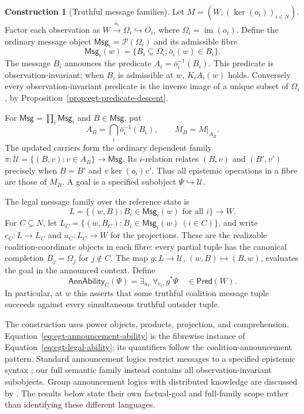 \documentclass[11pt,a4paper]{article}
\numberwithin{equation}{section}
\theoremstyle{definition}
\newtheorem{construction}[construction]{Construction}
\theoremstyle{remark}
\theoremstyle{plain}
\begin{document}
\begin{construction}[Truthful message families]
\label{con:egt-announcement-game}
Let $M=(W,(\ker(o_i))_{i\in N})$. Factor each observation as
$W\xrightarrow{\bar o_i}\Omega_i\hookrightarrow O_i$, where
$\Omega_i=\operatorname{im}(o_i)$. Define the ordinary message object
$\mathsf{Msg}_i=\mathcal P(\Omega_i)$ and its admissible fibre
\[
 \mathsf{Msg}_i(w)=\{B_i\subseteq\Omega_i:\bar o_i(w)\in B_i\}.
\]
The message $B_i$ announces the predicate
$A_i=\bar o_i^{-1}(B_i)$. This predicate is observation-invariant;
when $B_i$ is admissible at $w$, $K_iA_i(w)$ holds. Conversely every
observation-invariant predicate is the inverse image of a unique subset
of $\Omega_i$, by Proposition~\ref{prop:egt-predicate-descent}.

For $\mathsf{Msg}=\prod_i\mathsf{Msg}_i$ and $B\in\mathsf{Msg}$, put
\[
 A_B=\bigcap_i\bar o_i^{-1}(B_i),\qquad M_B=M|_{A_B}.
\]
The updated carriers form the ordinary dependent family
$\pi:\mathcal U=\{(B,v):v\in A_B\}\to\mathsf{Msg}$.
Its $i$-relation relates $(B,v)$ and $(B',v')$ precisely when
$B=B'$ and $v\ker(o_i)v'$. Thus all epistemic operations in a fibre
are those of $M_B$. A goal is a specified subobject
$\Psi\hookrightarrow\mathcal U$.

The legal message family over the reference state is
\[
 L=\{(w,B):B_i\in\mathsf{Msg}_i(w)\text{ for all }i\}
 \longrightarrow W.
\]
For $C\subseteq N$, let
$L_C=\{(w,B_C):B_i\in\mathsf{Msg}_i(w)\ (i\in C)\}$,
and write $e_C:L\to L_C$ and $u_C:L_C\to W$ for the projections.
These are the realizable coalition-coordinate objects in each fibre:
every partial tuple has the canonical completion $B_j=\Omega_j$ for
$j\notin C$. The map $g:L\to\mathcal U$, $(w,B)\mapsto(B,w)$,
evaluates the goal in the announced context. Define
\begin{equation}\label{eq:egt-announcement-ability}
 \mathsf{AnnAbility}_C(\Psi)
 =\exists_{u_C}\,\forall_{e_C}\,g^*\Psi
 \quad\in\mathsf{Pred}(W).
\end{equation}
In particular, at $w$ this asserts that some truthful coalition message
tuple succeeds against every simultaneous truthful outsider tuple.
\end{construction}

The construction uses power objects, products, projection, and
comprehension. Equation~\eqref{eq:egt-announcement-ability} is the
fibrewise instance of Equation~\eqref{eq:egt-legal-ability}; its
quantifiers follow the coalition-announcement pattern. Standard
announcement logics restrict messages to a specified epistemic syntax
\citep{AgotnesEtAl2010GroupAnnouncements,
GalimullinAlechina2018CoalitionGroupAnnouncement}; our full semantic
family instead contains all observation-invariant subobjects. Group
announcement logics with distributed knowledge are discussed by
\citet{AgotnesEtAl2022GroupDistributed}. The results below state their
own factual-goal and full-family scope rather than identifying these
different languages.
\end{document}
